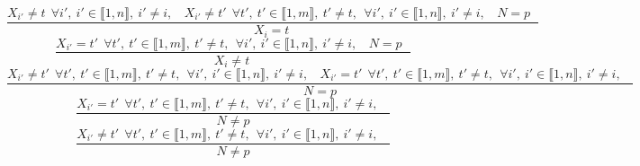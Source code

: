 $$\frac{X_{i'} \neq t~~\forall i',~i' \in \llbracket1,n\rrbracket,~i' \neq i,~~~~X_{i'} \neq t'~~\forall t',~t' \in \llbracket1,m\rrbracket,~t' \neq t,~~\forall i',~i' \in \llbracket1,n\rrbracket,~i' \neq i,~~~~N=p ~~~}{X_{i}=t~}$$ $$\frac{X_{i'}=t'~~\forall t',~t' \in \llbracket1,m\rrbracket,~t' \neq t,~~\forall i',~i' \in \llbracket1,n\rrbracket,~i' \neq i,~~~~N=p ~~~}{X_{i} \neq t~}$$ $$\frac{X_{i'} \neq t'~~\forall t',~t' \in \llbracket1,m\rrbracket,~t' \neq t,~~\forall i',~i' \in \llbracket1,n\rrbracket,~i' \neq i,~~~~X_{i'}=t'~~\forall t',~t' \in \llbracket1,m\rrbracket,~t' \neq t,~~\forall i',~i' \in \llbracket1,n\rrbracket,~i' \neq i,~~~~}{N=p }$$ $$\frac{X_{i'}=t'~~\forall t',~t' \in \llbracket1,m\rrbracket,~t' \neq t,~~\forall i',~i' \in \llbracket1,n\rrbracket,~i' \neq i,~~~~}{N \neq p }$$ $$\frac{X_{i'} \neq t'~~\forall t',~t' \in \llbracket1,m\rrbracket,~t' \neq t,~~\forall i',~i' \in \llbracket1,n\rrbracket,~i' \neq i,~~~~}{N \neq p }$$ 